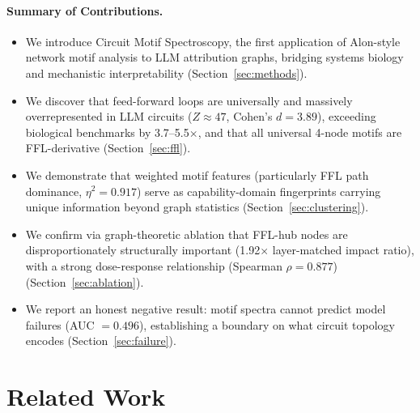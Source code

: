 \documentclass[11pt,letterpaper]{article}
\begin{document}
\paragraph{Summary of Contributions.}
\begin{itemize}
  \item We introduce Circuit Motif Spectroscopy, the first application of Alon-style network motif analysis to LLM attribution graphs, bridging systems biology and mechanistic interpretability (Section~\ref{sec:methods}).
  \item We discover that feed-forward loops are universally and massively overrepresented in LLM circuits ($Z \approx 47$, Cohen's $d = 3.89$), exceeding biological benchmarks by 3.7--5.5$\times$, and that all universal 4-node motifs are FFL-derivative (Section~\ref{sec:ffl}).
  \item We demonstrate that weighted motif features (particularly FFL path dominance, $\eta^2 = 0.917$) serve as capability-domain fingerprints carrying unique information beyond graph statistics (Section~\ref{sec:clustering}).
  \item We confirm via graph-theoretic ablation that FFL-hub nodes are disproportionately structurally important (1.92$\times$ layer-matched impact ratio), with a strong dose-response relationship (Spearman $\rho = 0.877$) (Section~\ref{sec:ablation}).
  \item We report an honest negative result: motif spectra cannot predict model failures (AUC $= 0.496$), establishing a boundary on what circuit topology encodes (Section~\ref{sec:failure}).
\end{itemize}

\section{Related Work}
\label{sec:related}
\end{document}
